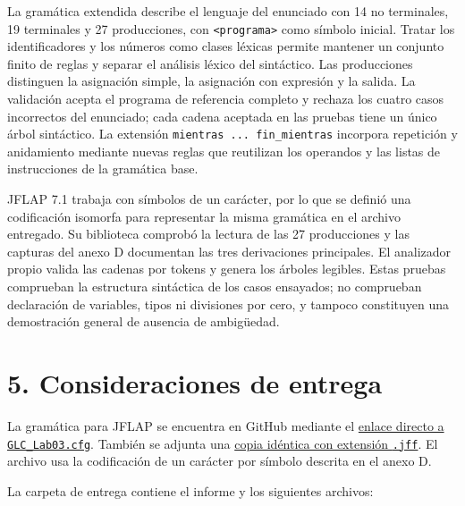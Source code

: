 \documentclass[11pt,letterpaper]{article}
\newcommand{\nt}[1]{\texttt{\textless #1\textgreater}}
\begin{document}
La gramática extendida describe el lenguaje del enunciado con 14 no terminales, 19 terminales y
27 producciones, con \nt{programa} como símbolo inicial. Tratar los identificadores y los números
como clases léxicas permite mantener un conjunto finito de reglas y separar el análisis léxico del
sintáctico. Las producciones distinguen la asignación simple, la asignación con expresión y la
salida. La validación acepta el programa de referencia completo y rechaza los cuatro casos
incorrectos del enunciado; cada cadena aceptada en las pruebas tiene un único árbol sintáctico.
La extensión \texttt{mientras ... fin\_mientras} incorpora repetición y anidamiento mediante nuevas
reglas que reutilizan los operandos y las listas de instrucciones de la gramática base.

JFLAP 7.1 trabaja con símbolos de un carácter, por lo que se definió una codificación isomorfa
para representar la misma gramática en el archivo entregado. Su biblioteca comprobó la lectura de
las 27 producciones y las capturas del anexo D documentan las tres derivaciones principales.
El analizador propio valida las cadenas por tokens y genera los árboles legibles. Estas pruebas
comprueban la estructura sintáctica de los casos ensayados; no comprueban declaración de variables,
tipos ni divisiones por cero, y tampoco constituyen una demostración general de ausencia de
ambigüedad.

\section*{5. Consideraciones de entrega}

La gramática para JFLAP se encuentra en GitHub mediante el
\href{https://github.com/FernandoValdes01/Lab03-TC/blob/main/gramatica/GLC_Lab03.cfg}{enlace directo a \texttt{GLC\_Lab03.cfg}}.
También se adjunta una
\href{https://github.com/FernandoValdes01/Lab03-TC/blob/main/gramatica/GLC_Lab03.jff}{copia idéntica con extensión \texttt{.jff}}.
El archivo usa la codificación de un carácter por símbolo descrita en el anexo D.

La carpeta de entrega contiene el informe y los siguientes archivos:
\end{document}
